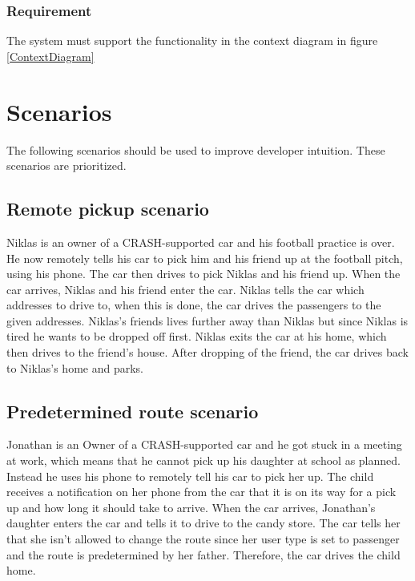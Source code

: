 \documentclass{article}
\begin{document}
    \subsubsection{Requirement}
\hfill \break 
\- \- \-The system must support the functionality in the context diagram in figure \ref{ContextDiagram}


\section{Scenarios}
The following scenarios should be used to improve developer intuition. These scenarios are prioritized.
\subsection {Remote pickup scenario}
Niklas is an owner of a CRASH-supported car and his football practice is over. He now remotely tells his car to pick him and his friend up at the football pitch, using his phone. The car then drives to pick Niklas and his friend up. When the car arrives, Niklas and his friend enter the car. Niklas tells the car which addresses to drive to, when this is done, the car drives the passengers to the given addresses. Niklas's friends lives further away than Niklas but since Niklas is tired he wants to be dropped off first. Niklas exits the car at his home, which then drives to the friend's house. After dropping of the friend, the car drives back to Niklas's home and parks.

\subsection {Predetermined route scenario}
Jonathan is an Owner of a CRASH-supported car and he got stuck in a meeting at work, which means that he cannot pick up his daughter at school as planned. Instead he uses his phone to remotely tell his car to pick her up. The child receives a notification on her phone from the car that it is on its way for a pick up and how long it should take to arrive. When the car arrives, Jonathan’s daughter enters the car and tells it to drive to the candy store. The car tells her that she isn't allowed to change the route since her user type is set to passenger and the route is predetermined by her father. Therefore, the car drives the child home.
\end{document}
